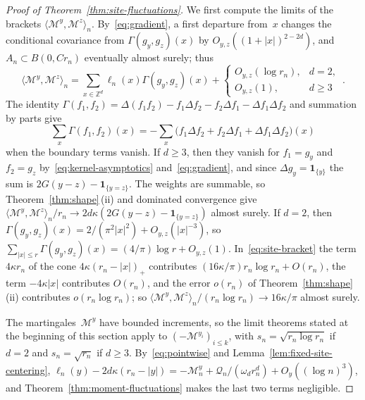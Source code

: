 \documentclass[11pt]{amsart}
\theoremstyle{plain}
\theoremstyle{definition}
\newcommand{\Z}{\mathbb Z}
\newcommand{\drift}{\kappa}
\newcommand{\ind}{\mathbf 1}
\numberwithin{equation}{section}
\begin{document}
\begin{proof}[Proof of Theorem~\ref{thm:site-fluctuations}]
We first compute the limits of the brackets $\langle\mathcal M^y,\mathcal M^z\rangle_n$. By~\eqref{eq:gradient}, a first departure from~$x$ changes the conditional covariance from $\Gamma(g_y,g_z)(x)$ by $O_{y,z}((1+|x|)^{2-2d})$, and $A_n\subset B(0,Cr_n)$ eventually almost surely; thus
\begin{equation}\label{eq:site-bracket}
\langle\mathcal M^y,\mathcal M^z\rangle_n
=\sum_{x\in\Z^d}\ell_n(x)\Gamma(g_y,g_z)(x)
+\begin{cases}O_{y,z}(\log r_n),&d=2,\\O_{y,z}(1),&d\geq3\end{cases}\, .
\end{equation}
The identity $\Gamma(f_1,f_2)=\Delta(f_1f_2)-f_1\Delta f_2-f_2\Delta f_1-\Delta f_1\Delta f_2$ and summation by parts give
\begin{equation}\label{eq:gamma-parts}
\sum_x\Gamma(f_1,f_2)(x)=-\sum_x\bigl(f_1\Delta f_2+f_2\Delta f_1+\Delta f_1\Delta f_2\bigr)(x)
\end{equation}
when the boundary terms vanish. If $d\geq3$, then they vanish for $f_1=g_y$ and $f_2=g_z$ by~\eqref{eq:kernel-asymptotics} and~\eqref{eq:gradient}, and since $\Delta g_y=\ind_{\{y\}}$ the sum is $2G(y-z)-\ind_{\{y=z\}}$. The weights are summable, so Theorem~\ref{thm:shape}\,(ii) and dominated convergence give $\langle\mathcal M^y,\mathcal M^z\rangle_n/r_n\to2d\drift(2G(y-z)-\ind_{\{y=z\}})$ almost surely. If $d=2$, then $\Gamma(g_y,g_z)(x)=2/(\pi^2|x|^2)+O_{y,z}(|x|^{-3})$, so $\sum_{|x|\leq r}\Gamma(g_y,g_z)(x)=(4/\pi)\log r+O_{y,z}(1)$. In~\eqref{eq:site-bracket} the term $4\drift r_n$ of the cone $4\drift(r_n-|x|)_+$ contributes $(16\drift/\pi)r_n\log r_n+O(r_n)$, the term $-4\drift|x|$ contributes $O(r_n)$, and the error $o(r_n)$ of Theorem~\ref{thm:shape}\,(ii) contributes $o(r_n\log r_n)$; so $\langle\mathcal M^y,\mathcal M^z\rangle_n/(r_n\log r_n)\to16\drift/\pi$ almost surely.

The martingales~$\mathcal M^y$ have bounded increments, so the limit theorems stated at the beginning of this section apply to $(-\mathcal M^{y_i})_{i\leq k}$, with $s_n=\sqrt{r_n\log r_n}$ if $d=2$ and $s_n=\sqrt{r_n}$ if $d\geq3$. By~\eqref{eq:pointwise} and Lemma~\ref{lem:fixed-site-centering}, $\ell_n(y)-2d\drift(r_n-|y|)=-\mathcal M_n^y+\mathcal Q_n/(\omega_dr_n^d)+O_y((\log n)^3)$, and Theorem~\ref{thm:moment-fluctuations} makes the last two terms negligible.
\end{proof}
\end{document}
